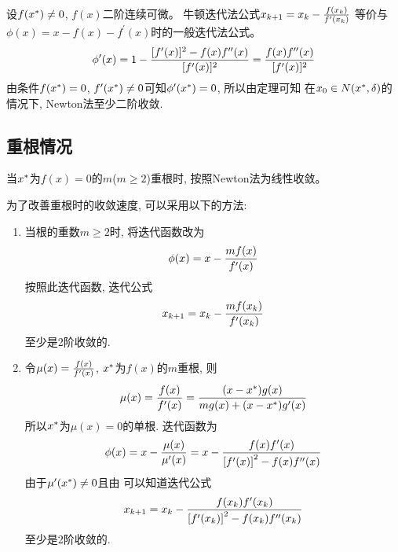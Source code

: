 \begin{the_speed_of_newton_method_convergence}
    设$f(x^\ast)\ne 0$, $f(x)$二阶连续可微。
    牛顿迭代法公式$x_{k+1} = x_k - {f(x_k)\over f^\prime(x_k)}$%
    等价与$\phi(x)=x-{f(x)-f^\prime(x)}$时的一般迭代法公式。
    \begin{equation}
        \phi^\prime(x) = 1 - {[f^\prime(x)]^2 - f(x)f^{\prime\prime}(x)%
        \over{[f^\prime(x)]^2}} = {f(x)f^{\prime\prime}(x)\over{[f^\prime(x)]^2}}
    \end{equation}
    由条件$f(x^\ast)=0$, $f^\prime(x^\ast)\ne 0$可知$\phi^\prime(x^\ast) = 0$, %
    所以由定理可知%
    在$x_0\in N(x^\ast, \delta)$的情况下, Newton法至少二阶收敛.
\end{the_speed_of_newton_method_convergence}

\subsection{重根情况}

当$x^\ast$为$f(x)=0$的$m$($m\ge2$)重根时, 按照Newton法为线性收敛。\par

为了改善重根时的收敛速度, 可以采用以下的方法:
\begin{enumerate}
    \item 当根的重数$m\ge2$时, 将迭代函数改为
        \begin{equation}
            \phi(x) = x - {m f(x)\over f^\prime(x)}
        \end{equation}
        按照此迭代函数, 迭代公式
        \begin{equation*}
            x_{k+1} = x_k - {m f(x_k)\over f^\prime(x_k)}
        \end{equation*}
        至少是2阶收敛的.
    \item 令$\mu(x) = {f(x)\over f^\prime(x)}$, $x^\ast$为$f(x)$的$m$重根, 则
        \begin{equation*}
            \mu(x) = {f(x)\over f^\prime(x)} = {(x-x^\ast)g(x)\over m\relax g(x) + (x-x^\ast)g^\prime(x)}
        \end{equation*}
        所以$x^\ast$为$\mu(x) = 0$的单根. 迭代函数为
        \begin{equation*}
            \phi(x) = x - {\mu(x)\over\mu^\prime(x)} = x - {f(x)f^\prime(x)\over%
            {\left[f^\prime(x)\right]^2 - f(x)f^{\prime\prime}(x)}}
        \end{equation*}
        由于$\mu^\prime(x^\ast)\ne0$且由%
        可以知道迭代公式
        \begin{equation}
            x_{k+1} = x_k - {f(x_k)f^\prime(x_k)\over{\left[f^\prime(x_k)\right]^2-%
            f(x_k)f^{\prime\prime}(x_k)}}
        \end{equation}
        至少是2阶收敛的.
\end{enumerate}

